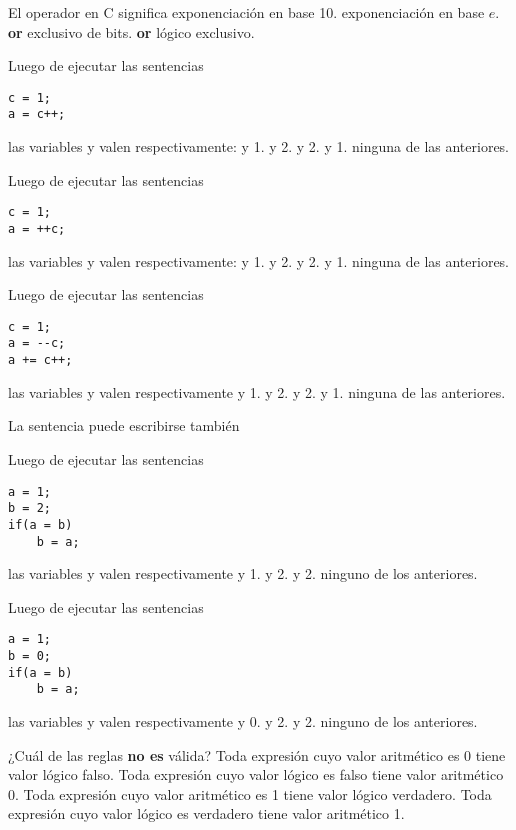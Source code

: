 \begin{preguntas}

\question El operador \code{^} en C significa
\choice exponenciación en base 10.
\choice exponenciación en base $e$.
\correctchoice \textbf{or} exclusivo de bits.
\choice \textbf{or} lógico exclusivo.

\question Luego de ejecutar las sentencias 
\begin{lstlisting}
c = 1; 
a = c++;	
\end{lstlisting}
las variables  y  valen respectivamente:
 y 1.
 y 2.
 y 2.
 y 1.
\choice ninguna de las anteriores.

\question Luego de ejecutar las sentencias 
\begin{lstlisting}
c = 1; 
a = ++c;
\end{lstlisting}
las variables  y  valen respectivamente:
 y 1.
 y 2.
 y 2.
 y 1.
\choice ninguna de las anteriores.

\question Luego de ejecutar las sentencias 
\begin{lstlisting}
c = 1; 
a = --c; 
a += c++;
\end{lstlisting}
las variables  y  valen respectivamente
 y 1.
 y 2.
 y 2.
 y 1.
\correctchoice ninguna de las anteriores.

\question La sentencia  puede escribirse también
\choice {}
\correctchoice {}
\choice {}
\choice {}

\question Luego de ejecutar las sentencias 
\begin{lstlisting}
a = 1; 
b = 2; 
if(a = b) 
	b = a;	
\end{lstlisting}
las variables  y  valen respectivamente 
 y 1.
 y 2.
 y 2.
\choice ninguno de los anteriores.

\question Luego de ejecutar las sentencias 
\begin{lstlisting}
a = 1; 
b = 0; 
if(a = b) 
	b = a;
\end{lstlisting}
las variables  y  valen respectivamente 
 y 0.
 y 2.
 y 2.
\choice ninguno de los anteriores.

\question ¿Cuál de las reglas \textbf{no es} válida?
\choice Toda expresión cuyo valor aritmético es 0 tiene valor lógico falso.
\choice Toda expresión cuyo valor lógico es falso tiene valor aritmético 0.
\choice Toda expresión cuyo valor aritmético es 1 tiene valor lógico verdadero.
\correctchoice Toda expresión cuyo valor lógico es verdadero tiene valor aritmético 1.


\end{preguntas}
